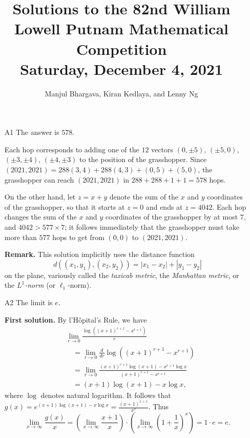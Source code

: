 \documentclass[amssymb,twocolumn,pra,10pt,aps]{revtex4-1}
\begin{document}
\title{Solutions to the 82nd William Lowell Putnam Mathematical Competition \\
    Saturday, December 4, 2021}
\author{Manjul Bhargava, Kiran Kedlaya, and Lenny Ng}
\noaffiliation
\maketitle

\begin{itemize}
\item[A1]
The answer is $578$. 

Each hop corresponds to adding one of the $12$ vectors $(0,\pm 5)$, $(\pm 5,0)$, $(\pm 3,\pm 4)$, $(\pm 4,\pm 3)$ to the position of the grasshopper. Since $(2021,2021) = 288(3,4)+288(4,3)+(0,5)+(5,0)$, the grasshopper can reach $(2021,2021)$ in $288+288+1+1=578$ hops.

On the other hand, let $z=x+y$ denote the sum of the $x$ and $y$ coordinates of the grasshopper, so that it starts at $z=0$ and ends at $z=4042$. Each hop changes the sum of the $x$ and $y$ coordinates of the grasshopper by at most $7$, and $4042 > 577 \times 7$; it follows immediately that the grasshopper must take more than $577$ hops to get from $(0,0)$ to $(2021,2021)$.

\noindent
\textbf{Remark.}
This solution implicitly uses the distance function 
\[
d((x_1, y_1), (x_2, y_2)) = |x_1 - x_2| + |y_1 - y_2|
\]
on the plane, variously called the \emph{taxicab metric}, the \emph{Manhattan metric}, or the \emph{$L^1$-norm} (or $\ell_1$-norm).

\item[A2]
The limit is $e$.

\noindent
\textbf{First solution.}
By l'H\^opital's Rule, we have
\begin{align*}
&\lim_{r\to 0} \frac{\log((x+1)^{r+1}-x^{r+1})}{r} \\
&\quad = \lim_{r\to 0} \frac{d}{dr} \log((x+1)^{r+1}-x^{r+1}) \\
&\quad = \lim_{r\to 0} \frac{(x+1)^{r+1}\log(x+1)-x^{r+1}\log x}{(x+1)^{r+1}-x^{r+1}} \\
&\quad = (x+1)\log(x+1)-x\log x,
\end{align*}
where $\log$ denotes natural logarithm. It follows that $g(x) = e^{(x+1)\log(x+1)-x\log x} = \frac{(x+1)^{x+1}}{x^x}$. Thus
\[
\lim_{x\to\infty} \frac{g(x)}{x} = \left(\lim_{x\to\infty}\frac{x+1}{x}\right) \cdot \left(\lim_{x\to\infty} \left(1+\frac{1}{x}\right)^x\right) = 1\cdot e = e.
\]


\end{itemize}
\end{document}

